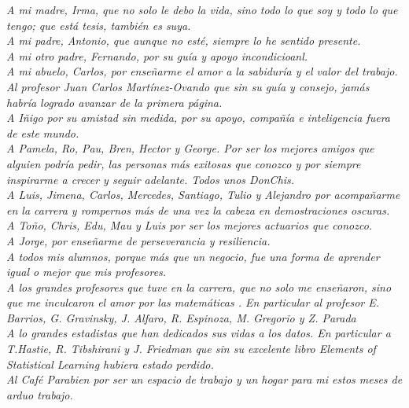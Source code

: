 \documentclass[../Main/Main.tex]{subfiles}
\begin{document}
\thispagestyle{empty}
\setcounter{page}{0} %
\begin{flushright}
	\null{}
	\emph{A mi madre, Irma, que no solo le debo la vida, sino todo lo que soy y todo lo que tengo; que está tesis, también es suya.} 
	\\
	\emph{A mi padre, Antonio, que aunque no esté, siempre lo he sentido presente.} 
	\\
	\emph{A mi otro padre, Fernando, por su guía y apoyo incondicioanl.}
	\\
	\emph{A mi abuelo, Carlos, por enseñarme el amor a la sabiduría y el valor del trabajo.}	
	\\
	\emph{Al profesor Juan Carlos Martínez-Ovando que sin su guía y consejo, jamás habría logrado avanzar de la primera página.}
	\\
	\emph{A Iñigo por su amistad sin medida, por su apoyo, compañía e inteligencia fuera de este mundo. }
	\\
	\emph{A Pamela, Ro, Pau, Bren, Hector y George. Por ser los mejores amigos que alguien podría pedir, las personas más exitosas que conozco y por siempre inspirarme a crecer y seguir adelante. Todos unos DonChis.}
	\\
	\emph{A Luis, Jimena, Carlos, Mercedes, Santiago, Tulio y Alejandro por acompañarme en la carrera y rompernos más de una vez la cabeza en demostraciones oscuras.}
	\\
	\emph{A Toño, Chris, Edu, Mau y Luis por ser los mejores actuarios que conozco.}
	\\
	\emph{A Jorge, por enseñarme de perseverancia y resiliencia.}
	\\
	\emph{A todos mis alumnos, porque más que un negocio, fue una forma de aprender igual o mejor que mis profesores.}
	\\
	\emph{A los grandes profesores que tuve en la carrera, que no solo me enseñaron, sino que me inculcaron el amor por las matemáticas . En particular al profesor E. Barrios, G. Gravinsky, J. Alfaro, R. Espinoza, M. Gregorio y Z. Parada}
	\\
	\emph{A lo grandes estadistas que han dedicados sus vidas a los datos. En particular a T.Hastie, R. Tibshirani y J. Friedman que sin su excelente libro \textit{Elements of Statistical Learning} hubiera estado perdido.} 
	\\
	\emph{Al Café Parabien por ser un espacio de trabajo y un hogar para mi estos meses de arduo trabajo.}
	\null
\end{flushright}
\end{document}
